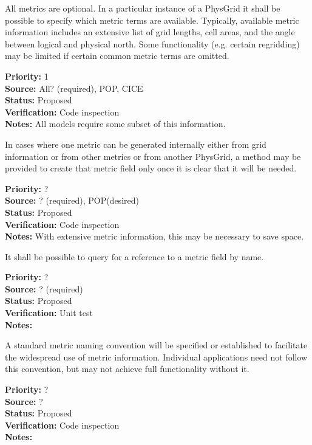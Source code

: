 All metrics are optional.  In a particular instance of a PhysGrid it shall be
possible to specify which metric terms are available.  Typically, available
metric information includes an extensive list of grid lengths, cell areas, and
the angle between logical and physical north.  Some functionality (e.g. certain
regridding) may be limited if certain common metric terms are omitted.
\begin{reqlist}
{\bf Priority:} 1 \\
{\bf Source:} All? (required), POP, CICE \\
{\bf Status:} Proposed \\
{\bf Verification:} Code inspection \\
{\bf Notes:} All models require some subset of this information.
\end{reqlist}

In cases where one metric can be generated internally either from grid information
or from other metrics or from another PhysGrid, a method may be provided to create
that metric field only once it is clear that it will be needed.
\begin{reqlist}
{\bf Priority:} ? \\
{\bf Source:} ? (required), POP(desired) \\
{\bf Status:} Proposed \\
{\bf Verification:} Code inspection \\
{\bf Notes:} With extensive metric information, this may be necessary to save space.
\end{reqlist}

It shall be possible to query for a reference to a metric field by name.
\begin{reqlist}
{\bf Priority:} ? \\
{\bf Source:} ? (required) \\
{\bf Status:} Proposed \\
{\bf Verification:} Unit test \\
{\bf Notes:} 
\end{reqlist}

A standard metric naming convention will be specified or established to facilitate
the widespread use of metric information.  Individual applications need not
follow this convention, but may not achieve full functionality without it.
\begin{reqlist}
{\bf Priority:} ? \\
{\bf Source:} ? \\
{\bf Status:} Proposed \\
{\bf Verification:} Code inspection \\
{\bf Notes:} 
\end{reqlist}

